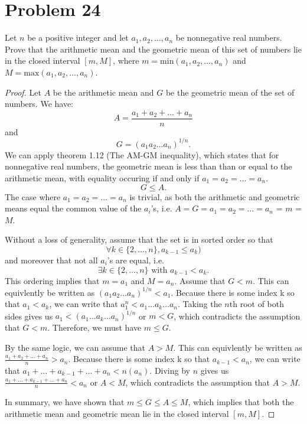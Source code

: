\documentclass[12pt]{article}
\begin{document}
  \section*{Problem 24}
  Let $n$ be a positive integer and let $a_1, a_2, \ldots, a_n$ be nonnegative real numbers. Prove that the arithmetic mean and the geometric mean of this set of numbers lie in the closed interval $[m, M]$, where $m = \text{min}(a_1, a_2, \ldots, a_n)$ and $M = \text{max}(a_1, a_2, \ldots, a_n)$.

  \begin{proof}
    Let $A$ be the arithmetic mean and $G$ be the geometric mean of the set of numbers. We have:
    \[
    A = \frac{a_1 + a_2 + \ldots + a_n}{n}
    \]
    and
    \[
    G = (a_1 a_2 \ldots a_n)^{1/n}.
    \]
    We can apply theorem 1.12 (The AM-GM inequality), which states that for nonnegative real numbers, the geometric mean is less than than or equal to the arithmetic mean, with equality occuring if and only if $a_1 = a_2 = \ldots = a_n$.
    \[
    G \leq A.
    \]
    The case where $a_1 = a_2 = \ldots = a_n$ is trivial, as both the arithmetic and geometric means equal the common value of the $a_i$'s, i.e. $A = G = a_1 = a_2 = \ldots = a_n$ = $m$ = $M$.
    
    \medbreak 
    \noindent Without a loss of generality, assume that the set is in sorted order so that 
    \[
      \forall k \in \{2, \ldots,  n\}, a_{k-1} \leq a_k)
    \]
    and moreover that not all $a_i$'s are equal, i.e.
    \[
      \exists k \in \{2, \ldots, n\} \text{ with } a_{k-1} < a_k.
    \] 
    This ordering implies that $m = a_1$ and $M = a_n$.
    Assume that $G < m$. This can equivlently be written as $(a_1 a_2 \ldots a_n)^{1/n} < a_1$. Because there is some index k so that $a_1 < a_k$, we can write that $a_1^n < a_1 \ldots a_k \ldots a_n$. Taking the $n$th root of both sides gives us $a_1 < (a_1 \ldots a_k \ldots a_n)^{1/n}$ or $m < G$, which contradicts the assumption that $G < m$. Therefore, we must have $m \leq G$.
    
    \medbreak 
    \noindent By the same logic, we can assume that $A > M$. This can equivlently be written as $\frac{a_1 + a_2 + \ldots + a_n}{n} > a_n$. Because there is some index k so that $a_{k-1} < a_n$, we can write that $a_1 + \ldots + a_{k-1}+ \ldots + a_n < n(a_n)$. Diving by $n$ gives us $\frac{a_1 + \ldots + a_{k-1}+ \ldots + a_n}{n} < a_n$ or $A < M$, which contradicts the assumption that $A > M$. 
    
    \medbreak
    \noindent In summary, we have shown that $m \leq G \leq A \leq M$, which implies that both the arithmetic mean and geometric mean lie in the closed interval $[m, M]$.
  \end{proof}


  
\end{document}
